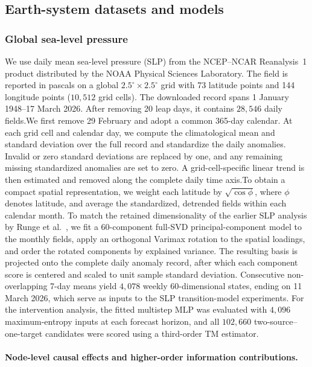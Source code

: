 \documentclass[fleqn,10pt]{wlscirep}
\begin{document}
\subsection{Earth-system datasets and models}
\label{app:earth_data}

\subsubsection{Global sea-level pressure}
\label{app:slp_data}

We use daily mean sea-level pressure (SLP) from the NCEP--NCAR Reanalysis~1 product distributed by the NOAA Physical Sciences Laboratory. The field is reported in pascals on a global $2.5^\circ\times2.5^\circ$ grid with 73 latitude points and 144 longitude points ($10{,}512$ grid cells). The downloaded record spans 1 January 1948--17 March 2026. After removing 20 leap days, it contains $28{,}546$ daily fields.We first remove 29 February and adopt a common 365-day calendar. At each grid cell and calendar day, we compute the climatological mean and standard deviation over the full record and standardize the daily anomalies. Invalid or zero standard deviations are replaced by one, and any remaining missing standardized anomalies are set to zero. A grid-cell-specific linear trend is then estimated and removed along the complete daily time axis.To obtain a compact spatial representation, we weight each latitude by $\sqrt{\cos\phi}$, where $\phi$ denotes latitude, and average the standardized, detrended fields within each calendar month. To match the retained dimensionality of the earlier SLP analysis by Runge et al.~\cite{runge2015identifying}, we fit a 60-component full-SVD principal-component model to the monthly fields, apply an orthogonal Varimax rotation to the spatial loadings, and order the rotated components by explained variance. The resulting basis is projected onto the complete daily anomaly record, after which each component score is centered and scaled to unit sample standard deviation. Consecutive non-overlapping 7-day means yield $4{,}078$ weekly 60-dimensional states, ending on 11 March 2026, which serve as inputs to the SLP transition-model experiments. For the intervention analysis, the fitted multistep MLP was evaluated with $4{,}096$ maximum-entropy inputs at each forecast horizon, and all $102{,}660$ two-source--one-target candidates were scored using a third-order TM estimator.


\paragraph{Node-level causal effects and higher-order information contributions.}
\label{app:slp_node_importance}
\end{document}
